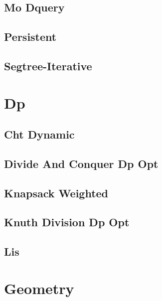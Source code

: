 \documentclass[9pt,portrait,twocolumn,a4paper,notitlepage]{article}
\newcommand\cppfile[2][]{%
\ifstrempty{#1}{}{}%
}
\begin{document}
\subsection{Mo Dquery}
\cppfile{data_structures_clean/Mo_DQuery.cpp}

\subsection{Persistent}
\cppfile{data_structures_clean/persistent.cpp}

\subsection{Segtree-Iterative}
\cppfile{data_structures_clean/segtree-iterative.cpp}


\section{Dp}

\subsection{Cht Dynamic}
\cppfile{dp_clean/CHT_Dynamic.cpp}

\subsection{Divide And Conquer Dp Opt}
\cppfile{dp_clean/divide_and_conquer_dp_opt.cpp}

\subsection{Knapsack Weighted}
\cppfile{dp_clean/Knapsack_weighted.cpp}

\subsection{Knuth Division Dp Opt}
\cppfile{dp_clean/knuth_division_dp_opt.cpp}

\subsection{Lis}
\cppfile{dp_clean/LIS.cpp}


\section{Geometry}
\end{document}
